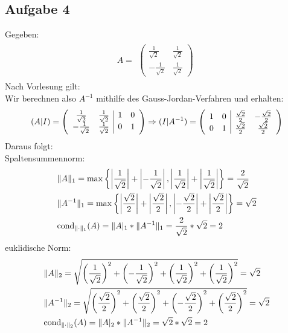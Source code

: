 \newpage
\subsection*{Aufgabe 4}
Gegeben:
\begin{align*} \label{eq8}
A=
\begin{split}
\begin{pmatrix}
\frac{1}{\sqrt2} & \frac{1}{\sqrt2} \\
-\frac{1}{\sqrt2} &\frac{1}{\sqrt2}
\end{pmatrix}
\end{split}
\end{align*}
Nach Vorlesung gilt: \\

Wir berechnen also $A^{-1}$ mithilfe des Gauss-Jordan-Verfahren und erhalten:
\begin{align*}
(A|I)=
\begin{split}
\begin{array}({cc|cc})
\frac{1}{\sqrt2} & \frac{1}{\sqrt2} & 1 & 0 \\
-\frac{1}{\sqrt2} &\frac{1}{\sqrt2} & 0 & 1
\end{array}
\Rightarrow(I|A^{-1})=
\begin{array}({cc|cc})
 1 & 0 & \frac{\sqrt2}{2} & -\frac{\sqrt2}{2} \\
 0 & 1 & \frac{\sqrt2}{2} & \frac{\sqrt2}{2}
\end{array}
\end{split}
\end{align*}
Daraus folgt:\\
Spaltensummennorm:
\begin{align*}
\begin{split}
&\|A\|_1=\mathrm{max}\left\lbrace \left|\frac{1}{\sqrt2}\right|+\left|-\frac{1}{\sqrt2}\right|, \left|\frac{1}{\sqrt2}\right|+\left|\frac{1}{\sqrt2}\right|\right\rbrace=\frac{2}{\sqrt2}\\
&\|A^{-1}\|_1=\mathrm{max}\left\lbrace\left|\frac{\sqrt2}{2}\right|+\left|\frac{\sqrt2}{2}\right|, \left|-\frac{\sqrt2}{2}\right|+\left|\frac{\sqrt2}{2}\right|\right\rbrace={\sqrt2}\\
& \mathrm{cond}_{\| \cdot \|_1}(A)=\|A|_1*\|A^{-1}\|_1=\frac{2}{\sqrt2} * {\sqrt2} = 2\\
\end{split}
\end{align*}
euklidische Norm:
\begin{align*}
\begin{split}
&\|A\|_2=\sqrt{ \left(\frac{1}{\sqrt2}\right)^2+\left(-\frac{1}{\sqrt2}\right)^2+\left(\frac{1}{\sqrt2}\right)^2+\left(\frac{1}{\sqrt2}\right)^2}=\sqrt{2}\\
&\|A^{-1}\|_2=\sqrt{\left(\frac{\sqrt2}{2}\right)^2+\left(\frac{\sqrt2}{2}\right)^2 + \left(-\frac{\sqrt2}{2}\right)^2 + \left(\frac{\sqrt2}{2}\right)^2}=\sqrt{2}\\
& \mathrm{cond}_{\| \cdot \|_2}(A)=\|A|_2*\|A^{-1}\|_2=\sqrt{2}*\sqrt{2}=2\\
\end{split}
\end{align*}
